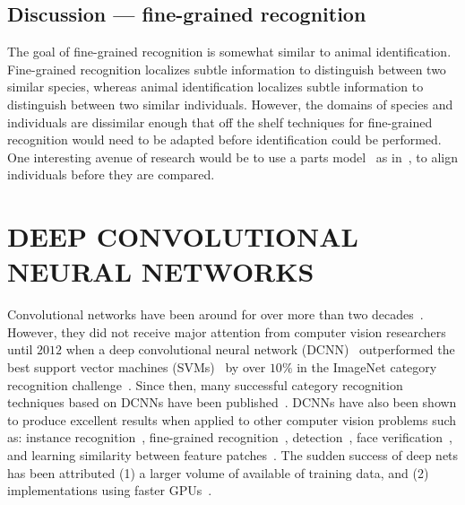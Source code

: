     \subsection{Discussion --- fine-grained recognition}
        The goal of fine-grained recognition is somewhat similar to animal identification. Fine-grained recognition
        localizes subtle information to distinguish between two similar species, whereas animal identification
        localizes subtle information to distinguish between two similar individuals. However, the domains of
        species and individuals are dissimilar enough that off the shelf techniques for fine-grained recognition
        would need to be adapted before identification could be performed. One interesting avenue of research would
        be to use a parts model~\cite{felzenszwalb_object_2010} as in~\cite{gavves_local_2014}, to align
        individuals before they are compared.


\section{DEEP CONVOLUTIONAL NEURAL NETWORKS}\label{sec:dcnn}
    Convolutional networks have been around for over more than two decades~\cite{lecun_gradient_based_1998,
    fukushima_neocognitron_1988}. However, they did not receive major attention from computer vision researchers
    until $2012$ when a deep convolutional neural network (DCNN)~\cite{krizhevsky_imagenet_2012} outperformed the
    best support vector machines (SVMs)~\cite{vapnik_statistical_1998} by over $10\percent$ in the ImageNet
    category recognition challenge~\cite{russakovsky_imagenet_2015}. Since then, many successful category
    recognition techniques based on DCNNs have been published~\cite{simonyan_very_2015, chatfield_efficient_2015,
    chatfield_return_2014, oquab_learning_2014, szegedy_going_2015, long_convnets_2014, he_spatial_2014,
    dean_fast_2013}. DCNNs have also been shown to produce excellent results when applied to other computer vision
    problems such as: %
    instance recognition~\cite{razavian_cnn_2014, razavian_baseline_2015, liu_learning_2015,
    held_deep_2015,arandjelovic_netvlad_2016,radenovic_cnn_2016}, %
    fine-grained recognition~\cite{branson_bird_2014, donahue_decaf_2014, catherine_wah_similarity_2014}, %
    detection~\cite{girshick_rich_2014, sermanet_overfeat_2013, li_wan_end_end_2015}, %
    face verification~\cite{huang_learning_2012, taigman_deepface_2014, sun_deep_2013}, %
    and learning similarity between feature patches~\cite{osendorfer_convolutional_2013, han_matchnet_2015,
    ng_exploiting_2015, zagoruyko_learning_2015, han_matchnet_2015}. The sudden success of deep nets has been
    attributed (1) a larger volume of available of training data, and (2) implementations using faster
    GPUs~\cite{krizhevsky_imagenet_2012}.
      
